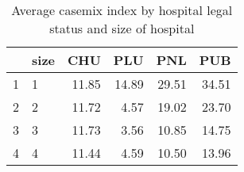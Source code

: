 \begin{table}[ht]
\centering
\begin{tabular}{rlrrrr}
  \hline
 & size & CHU & PLU & PNL & PUB \\ 
  \hline
1 & 1 & 11.85 & 14.89 & 29.51 & 34.51 \\ 
  2 & 2 & 11.72 & 4.57 & 19.02 & 23.70 \\ 
  3 & 3 & 11.73 & 3.56 & 10.85 & 14.75 \\ 
  4 & 4 & 11.44 & 4.59 & 10.50 & 13.96 \\ 
   \hline
\end{tabular}
\caption{Average casemix index by hospital legal status and size of hospital} 
\end{table}
